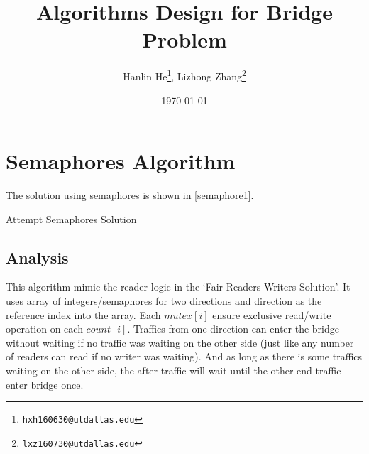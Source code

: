 \documentclass{article}
\title{Algorithms Design for Bridge Problem}
\author{Hanlin He\footnote{\texttt{hxh160630@utdallas.edu}},
Lizhong Zhang\footnote{\texttt{lxz160730@utdallas.edu}}}
\date{\today}
\begin{document}
\maketitle

\section*{Semaphores Algorithm}

The solution using semaphores is shown in \cref{semaphore1}.

\begin{algorithm}[H]
\caption{Attempt Semaphores Solution}\label{semaphore1}
\begin{algorithmic}
    \State{}
        \EndIf{}
        \State{}
    \EndFunction{}
    \State{}
        \EndIf{}
    \EndFunction{}
\end{algorithmic}
\end{algorithm}

\subsection*{Analysis}

This algorithm mimic the reader logic in the `Fair Readers-Writers Solution'.
It uses array of integers/semaphores for two directions and direction as the
reference index into the array. Each $mutex[i]$ ensure exclusive read/write
operation on each $count[i]$. Traffics from one direction can enter the bridge
without waiting if no traffic was waiting on the other side (just like any
number of readers can read if no writer was waiting). And as long as there is
some traffics waiting on the other side, the after traffic will wait until the
other end traffic enter bridge once.
\end{document}
